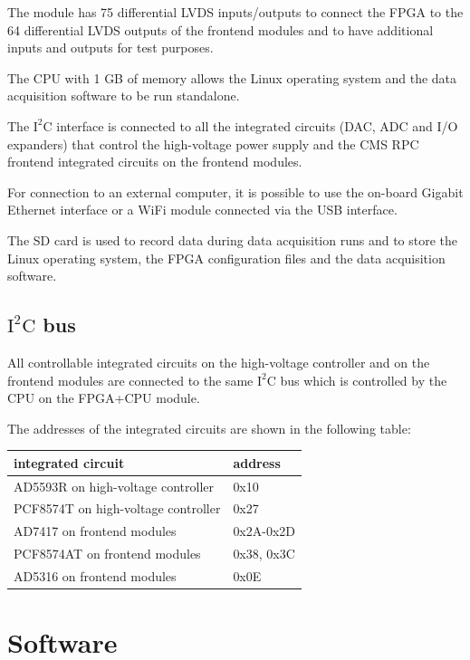 \documentclass[12pt, a4paper]{article}
\begin{document}
The module has 75 differential LVDS inputs/outputs to connect the FPGA to the 64 differential LVDS outputs of the frontend modules and to have additional inputs and outputs for test purposes.

The CPU with 1 GB of memory allows the Linux operating system and the data acquisition software to be run standalone.

The $\text{I}^\text{2}\text{C}$ interface is connected to all the integrated circuits (DAC, ADC and I/O expanders) that control the high-voltage power supply and the CMS RPC frontend integrated circuits on the frontend modules.

For connection to an external computer, it is possible to use the on-board Gigabit Ethernet interface or a WiFi module connected via the USB interface.

The SD card is used to record data during data acquisition runs and to store the Linux operating system, the FPGA configuration files and the data acquisition software.

\subsection{$\text{I}^\text{2}\text{C}$ bus}

All controllable integrated circuits on the high-voltage controller and on the frontend modules are connected to the same $\text{I}^\text{2}\text{C}$ bus which is controlled by the CPU on the FPGA+CPU module.

The addresses of the integrated circuits are shown in the following table:
\begin{center}
  \begin{tabular}{|l|l|}
  \hline
  \textbf{integrated circuit} & \textbf{address} \\
  \hline
  AD5593R on high-voltage controller & 0x10 \\
  \hline
  PCF8574T on high-voltage controller & 0x27 \\
  \hline
  AD7417 on frontend modules & 0x2A-0x2D \\
  \hline
  PCF8574AT on frontend modules & 0x38, 0x3C \\
  \hline
  AD5316 on frontend modules & 0x0E \\
  \hline
  \end{tabular}
\end{center}

\section{Software}
\end{document}
